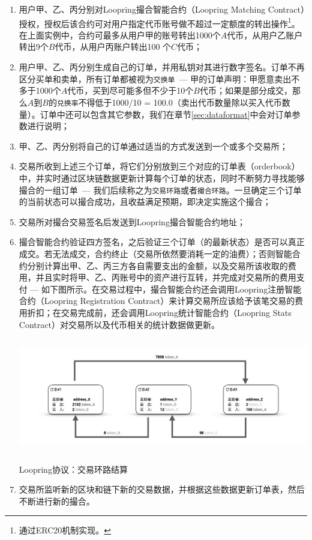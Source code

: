 \documentclass[UTF8,nofonts]{ctexart}
\makeatletter
\newenvironment{figurehere}
  {\def\@captype{figure}}
  {}
\makeatother
\begin{document}
\begin{enumerate}
  \item 用户甲、乙、丙分别对Loopring撮合智能合约（Loopring Matching Contract）授权，授权后该合约可对用户指定代币账号做不超过一定额度的转出操作\footnote{通过ERC20机制实现。}。在上面实例中，合约可最多从用户甲的账号转出1000个$A$代币，从用户乙账户转出9个$B$代币，从用户丙账户转出100 个$C$代币；
  \item 用户甲、乙、丙分别生成自己的订单，并用私钥对其进行数字签名。订单不再区分买单和卖单，所有订单都被视为\texttt{交换单}\ --- 甲的订单声明：甲愿意卖出不多于1000个$A$代币，买到尽可能多但不少于10个$B$代币；如果是部分成交，那么$A$到$B$的\texttt{兑换率}不得低于1000/10 = 100.0（卖出代币数量除以买入代币数量）。订单中还可以包含其它参数，我们在章节\ref{sec:dataformat}中会对订单参数进行说明；
  \item 甲、乙、丙分别将自己的订单通过适当的方式发送到一个或多个交易所；
  \item 交易所收到上述三个订单，将它们分别放到三个对应的订单表（orderbook）中，并实时通过区块链数据更新计算每个订单的状态，同时不断努力寻找能够撮合的一组订单\ --- 我们后续称之为\texttt{交易环路}或者\texttt{撮合环路}。一旦确定三个订单的当前状态可以撮合成功，且收益满足预期，即决定实施这个撮合；
  \item 交易所对撮合交易签名后发送到Loopring撮合智能合约地址；
  \item 撮合智能合约验证四方签名，之后验证三个订单（的最新状态）是否可以真正成交。若无法成交，合约终止（交易所依然要消耗一定的油费）；否则智能合约分别计算出甲、乙、丙三方各自需要支出的金额，以及交易所该收取的费用，并且实时将甲、乙、丙账号中的资产进行互转，并完成对交易所的费用支付 --- 如下图所示。在交易过程中，撮合智能合约还会调用Loopring注册智能合约（Loopring Registration Contract）来计算交易所应该给予该笔交易的费用折扣；在交易完成前，还会调用Loopring统计智能合约（Loopring Stats Contract）对交易所以及代币相关的统计数据做更新。

\begin{center}
\begin{figurehere}
\includegraphics[height=5cm]{images/zh-Loopring-example.png}
\caption{Loopring协议：交易环路结算}
\label{fig:Loopringprotocol}
\end{figurehere}
\end{center}
  
  \item 交易所监听新的区块和链下新的交易数据，并根据这些数据更新订单表，然后不断进行新的撮合。
\end{enumerate}
\end{document}
